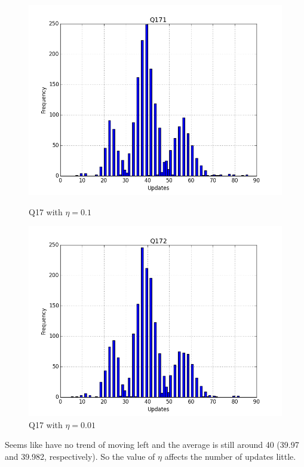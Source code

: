 \documentclass[12pt]{article}
\begin{document}
\begin{figure}[h]
\centering
  \begin{minipage}[b]{0.45\textwidth}
    \includegraphics[width=\textwidth]{Q171.png}
    \caption{Q17 with $\eta=0.1$}
  \end{minipage}
  \hfill
  \begin{minipage}[b]{0.45\textwidth}
    \includegraphics[width=\textwidth]{Q172.png}
    \caption{Q17 with $\eta=0.01$}
  \end{minipage}
\end{figure}
Seems like have no trend of moving left and the average is still around 40 (39.97 and 39.982, respectively). So the value of $\eta$ affects the number of updates little.
\end{document}
